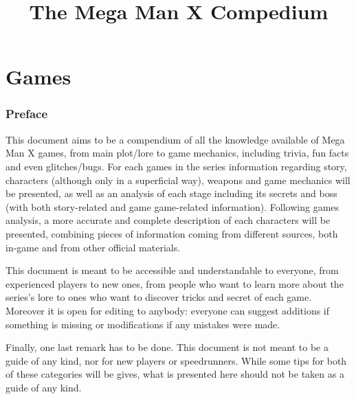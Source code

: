 \documentclass[openany]{report}
\title{The Mega Man X Compedium}
\begin{document}
\begin{titlepage}
	\maketitle
	\thispagestyle{empty}
\end{titlepage}



\tableofcontents

\part{Games}
	\section*{Preface}
	This document aims to be a compendium of all the knowledge available of Mega Man X games, from main plot/lore to game mechanics, including trivia, fun facts and even glitches/bugs. For each games in the series information regarding story, characters (although only in a superficial way), weapons and game mechanics will be presented, as well as an analysis of each stage including its secrets and boss (with both story-related and game game-related information). Following games analysis, a more accurate and complete description of each characters will be presented, combining pieces of information coming from different sources, both in-game and from other official materials.

	This document is meant to be accessible and understandable to everyone, from experienced players to new ones, from people who want to learn more about the series's lore to ones who want to discover tricks and secret of each game. Moreover it is open for editing to anybody: everyone can suggest additions if something is missing or modifications if any mistakes were made.
	
	Finally, one last remark has to be done. This document is not meant to be a guide of any kind, nor for new players or speedrunners. While some tips for both of these categories will be gives, what is presented here should not be taken as a guide of any kind.
\end{document}

